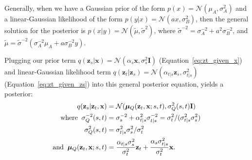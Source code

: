 \documentclass{article}
\def\Eqref#1{Equation~\ref{#1}}
\def\rvx{{\mathbf{x}}}
\def\rvz{{\mathbf{z}}}
\newcommand{\bfI}{\mathbf{I}}
\newcommand{\bmu}{{\boldsymbol{\mu}}}
\begin{document}
Generally, when we have a Gaussian prior of the form $p(x) = \mathcal{N}(\mu_A, \sigma_A^2)$ and a linear-Gaussian likelihood of the form $p(y|x) = \mathcal{N}(a x, \sigma_B^2)$, then the general solution for the posterior is $p(x|y) = \mathcal{N}(\tilde{\mu}, \tilde{\sigma}^2)$, where $\tilde{\sigma}^{-2} = \sigma_A^{-2} + a^2 \sigma_B^{-2}$, and $\tilde{\mu} = \tilde{\sigma}^{-2} (\sigma_A^{-2} \mu_A + a \sigma_B^{-2} y)$.

Plugging our prior term $q(\rvz_s|\rvx) = \mathcal{N}\left(\alpha_s \rvx, \sigma^2_s \bfI\right)$ (\Eqref{eq:zt_given_x}) and linear-Gaussian likelihood term $q(\rvz_t|\rvz_s) = \mathcal{N}(\alpha_{t|s} \rvz_s, \sigma^2_{t|s})$ (\Eqref{eq:zt_given_zs}) into this general posterior equation, yields a posterior:
\begin{align}
q(\rvz_s|\rvz_t,\rvx) &= \mathcal{N}(\bmu_{Q}(\rvz_{t},\rvx; s,t), \sigma^2_Q(s,t) \bfI)\\
\text{where\;\;}
\sigma^{-2}_Q(s,t) 
&= \sigma_s^{-2} + \alpha_{t|s}^{2}\sigma^{-2}_{t|s}\label{eq:postvar}
= \sigma^2_t / (\sigma^2_{t|s}\sigma^2_s)\\
\sigma^{2}_Q(s,t) &= \sigma^2_{t|s}\sigma^2_s / \sigma^2_t\\
\text{and\;\;}
\bmu_{Q}(\rvz_{t},\rvx; s,t) 
&
= \frac{\alpha_{t|s}\sigma^{2}_s}{\sigma^{2}_t}\rvz_{t} + \frac{\alpha_s \sigma^{2}_{t|s}}{\sigma^{2}_{t}}\rvx.
\end{align}
\end{document}
